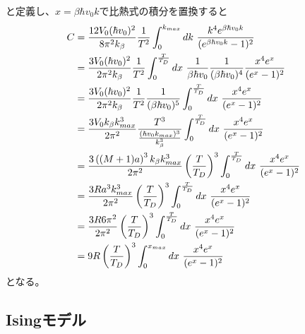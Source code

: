 \documentclass{jsarticle}  %
\numberwithin{equation}{section} %
\numberwithin{figure}{section}
\begin{document}
    と定義し、$x = \beta \hbar v_0 k$で比熱式の積分を置換すると
    \begin{align}
        C &= \frac{12V_0(\hbar v_0)^2}{8\pi^2 k_\beta} \frac{1}{T^2} \int_0^{k_{max}} dk\ \frac{k^4 e^{\beta \hbar v_0 k}}{(e^{\beta \hbar v_0 k} - 1)^2} \notag \\
        &= \frac{3V_0(\hbar v_0)^2}{2\pi^2 k_\beta} \frac{1}{T^2} \int_0^{\frac{T}{T_D}} dx\ \frac{1}{\beta \hbar v_0} \frac{1}{(\beta \hbar v_0)^4}\frac{ x^4e^x}{(e^x - 1)^2} \notag \\
        &= \frac{3V_0(\hbar v_0)^2}{2\pi^2 k_\beta} \frac{1}{T^2} \frac{1}{(\beta \hbar v_0)^5} \int_0^{\frac{T}{T_D}} dx\ \frac{ x^4e^x}{(e^x - 1)^2} \notag \\
        &= \frac{3V_0 k_\beta k_{max}^3}{2\pi^2} \frac{T^3}{\frac{(\hbar v_0 k_{max})^3}{k_\beta^3}} \int_0^{\frac{T}{T_D}} dx\ \frac{ x^4e^x}{(e^x - 1)^2} \notag \\ 
        &= \frac{3\left( {(M+1)a} \right)^3  k_\beta k_{max}^3}{2\pi^2} \left( \frac{T}{T_D} \right)^3 \int_0^{\frac{T}{T_D}} dx\ \frac{ x^4e^x}{(e^x - 1)^2} \notag \\
        &= \frac{3R a^3  k_{max}^3}{2\pi^2} \left( \frac{T}{T_D} \right)^3 \int_0^{\frac{T}{T_D}} dx\ \frac{ x^4e^x}{(e^x - 1)^2} \notag \\
        &= \frac{3R 6\pi^2}{2\pi^2} \left( \frac{T}{T_D} \right)^3 \int_0^{\frac{T}{T_D}} dx\ \frac{ x^4e^x}{(e^x - 1)^2} \notag \\
        &= 9R \left( \frac{T}{T_D} \right)^3 \int_0^{x_{max}} dx\ \frac{ x^4e^x}{(e^x - 1)^2} \notag 
    \end{align}
    となる。
\subsection{Isingモデル}
\end{document}
